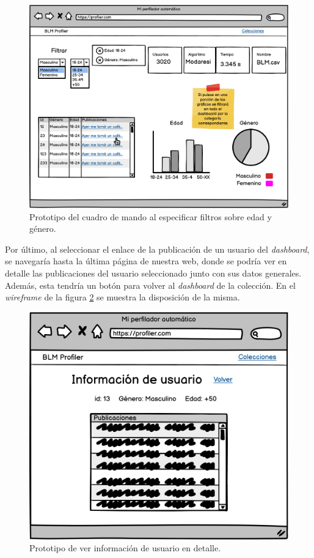 \begin{figure}[H]
  \centering
  \includegraphics[width=\textwidth]{imaxes/prototipo/dashboard-filtered.png}
  \caption{Prototipo del cuadro de mando al especificar filtros sobre edad y género.}
  \label{fig:proto-dashboard-filtered}
\end{figure}

Por último, al seleccionar el enlace de la publicación de un usuario del \textit{dashboard}, se navegaría hasta la última página de nuestra web, donde se podría ver en detalle las publicaciones del usuario seleccionado junto con sus datos generales. Además, esta tendría un botón para volver al \textit{dashboard} de la colección. En el \textit{wireframe} de la figura \ref{fig:proto-info-user} se muestra la disposición de la misma.

\begin{figure}[H]
  \centering
  \includegraphics[width=\textwidth]{imaxes/prototipo/info-user.png}
  \caption{Prototipo de ver información de usuario en detalle.}  \label{fig:proto-info-user}
\end{figure}

